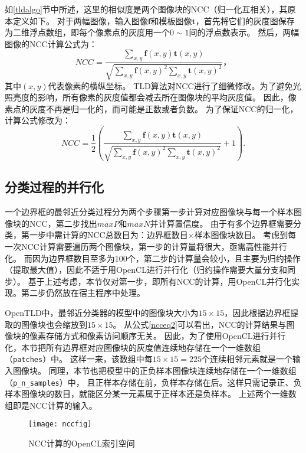 如\ref{tldalgo}节中所述，这里的相似度是两个图像块的NCC（归一化互相关），其原本定义如下。
对于两幅图像，输入图像$\mathbf{f}$和模板图像$\mathbf{t}$，首先将它们的灰度图保存为二维浮点数组，即每个像素点的灰度用一个$0\sim1$间的浮点数表示。
然后，两幅图像的NCC计算公式为：
\begin{equation}
\label{ncceq}
NCC = \frac{ \sum_{x,y}\mathbf{f}(x, y)\mathbf{t}(x, y) }{ \sqrt{\sum_{x,y}\mathbf{f}(x, y)^2\sum_{x,y}\mathbf{t}(x, y)^2} } ，
\end{equation}
其中$(x, y)$代表像素的横纵坐标。
TLD算法对NCC进行了细微修改。为了避免光照亮度的影响，所有像素的灰度值都会减去所在图像块的平均灰度值。
因此，像素点的灰度不再是归一化的，而可能是正数或者负数。
为了保证NCC的归一化，计算公式修改为：
\begin{equation}
\label{ncceq2}
NCC = \frac{1}{2}( \frac{ \sum_{x,y}\mathbf{f}(x, y)\mathbf{t}(x, y) }{ \sqrt{\sum_{x,y}\mathbf{f}(x, y)^2\sum_{x,y}\mathbf{t}(x, y)^2} } + 1 ).
\end{equation}

\subsection{分类过程的并行化}
一个边界框的最邻近分类过程分为两个步骤\pozhehao 第一步计算对应图像块与每一个样本图像块的NCC，第二步找出$maxP$和$maxN$并计算置信度。
由于有多个边界框需要分类，第一步中需计算的NCC总数目为：边界框数目$\times$样本图像块数目。
考虑到每一次NCC计算需要遍历两个图像块，第一步的计算量将很大，亟需高性能并行化。
而因为边界框数目至多为100个，第二步的计算量会较小，且主要为归约操作（提取最大值），因此不适于用OpenCL进行并行化（归约操作需要大量分支和同步）。
基于上述考虑，本节仅对第一步，即所有NCC的计算，用OpenCL并行化实现。第二步仍然放在宿主程序中处理。

OpenTLD中，最邻近分类器的模型中的图像块大小为$15\times15$，因此根据边界框提取的图像块也会缩放到$15\times15$。
从公式\ref{ncceq2}可以看出，NCC的计算结果与图像块的像素存储方式和像素访问顺序无关。
因此，为了使用OpenCL进行并行化，本节把所有边界框对应图像块的灰度值连续地存储在一个一维数组（\texttt{patches}）中。
这样一来，该数组中每$15\times15=225$个连续相邻元素就是一个输入图像块。
同理，本节也把模型中的正负样本图像块连续地存储在一个一维数组（\texttt{p\_n\_samples}）中，
且正样本存储在前，负样本存储在后。这样只需记录正、负样本图像块的数目，就能区分某一元素属于正样本还是负样本。
上述两个一维数组即是NCC计算的输入。

\begin{figure}[htb]
  \centering
  \texttt{[image: nccfig]}
  \caption{NCC计算的OpenCL索引空间}
  \label{nccfig}
\end{figure}

